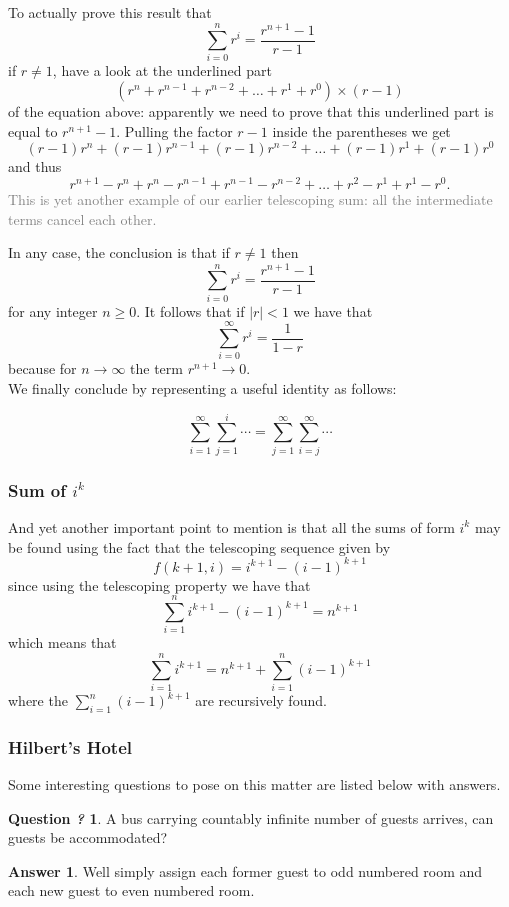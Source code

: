 \documentclass[titlepage]{article}
\theoremstyle{definition}
\numberwithin{equation}{subsection}
\numberwithin{remark}{subsection}
\newtheorem{question}{Question \textit{?}}[subsection]
\newtheorem{answer}{Answer}[subsection]
\begin{document}
To actually prove this result that
$$\sum_{i=0}^nr^i=\frac{r^{n+1}-1}{r-1}$$
if $r\ne 1$, have a look at the underlined part
$$(r^n+r^{n-1}+r^{n-2}+\ldots+r^1+r^0)\times(r-1)$$
of the equation above: 
apparently we need to prove that this underlined part is equal to $r^{n+1}-1$.
Pulling the factor $r-1$ inside the parentheses we get
$$(r-1)r^n+(r-1)r^{n-1}+(r-1)r^{n-2}+\ldots+(r-1)r^1+(r-1)r^0$$
and thus
$$r^{n+1}-r^n+r^n-r^{n-1}+r^{n-1}-r^{n-2}+\ldots+r^2-r^1+r^1-r^0.$$
\textcolor{gray}{This is yet another example of our earlier telescoping sum: all the intermediate terms cancel each other.}


In any case, the conclusion is that if $r\ne1$ then
$$\sum_{i=0}^nr^i=\frac{r^{n+1}-1}{r-1}$$
for any integer $n\ge0$.
It follows that if $|r|<1$ we have that
$$\sum_{i=0}^\infty r^i=\frac{1}{1-r}$$
because for $n\to\infty$ the term $r^{n+1}\to0$.
\\

We finally conclude by representing a useful identity as follows:

$$ \sum_{i=1}^{\infty}\sum_{j=1}^{i} \cdots =  \sum_{j=1}^{\infty}\sum_{i=j}^{\infty} \cdots$$
\clearpage

\subsubsection{Sum of $i^k$}
And yet another important point to mention is that all the sums of form $i^k$ may be found using the fact that the telescoping sequence given by $$f(k+1,i) = i^{k+1} - (i-1)^{k+1}$$ since using the telescoping property we have that $$\sum_{i=1}^{n} i^{k+1} - (i-1)^{k+1} = n^{k+1} $$ which means that $$\sum_{i=1}^{n} i^{k+1} = n^{k+1} + \sum_{i=1}^{n}(i-1)^{k+1} $$ where the $\sum_{i=1}^{n}(i-1)^{k+1}$ are recursively found. 


\subsubsection{Hilbert's Hotel}

Some interesting questions to pose on this matter are listed below with answers. 
\begin{question}
A bus carrying countably infinite number of guests arrives, can guests be accommodated? 
\end{question}
\begin{answer}
Well simply assign each former guest to odd numbered room and each new guest to even numbered room. 
\end{answer}
\end{document}
